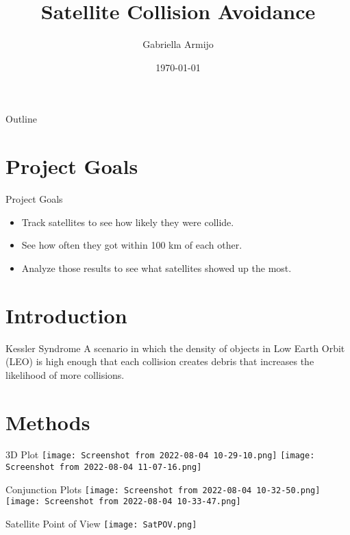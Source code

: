 \documentclass{beamer}
\title{Satellite Collision Avoidance}
\author{Gabriella Armijo}
\institute{Institute for Computing in Research}
\date{\today}
\begin{document}
\begin{frame}
    \titlepage 
\end{frame}

\logo{}


\begin{frame}{Outline}
    \tableofcontents
\end{frame}

\section{Project Goals}
\begin{frame}{Project Goals}
\begin{itemize}
\item Track satellites to see how likely they were collide. 
\item See how often they got within 100 km of each other. 
\item Analyze those results to see what satellites showed up the most.
\end{itemize}
\end{frame}

\section{Introduction}
\begin{frame}{Kessler Syndrome}
A scenario in which the density of objects in Low Earth Orbit (LEO) is high enough that each collision creates debris that increases the likelihood of more collisions.
\end{frame}

\section{Methods}
\begin{frame}{3D Plot}
\texttt{[image: Screenshot from 2022-08-04 10-29-10.png]}
\texttt{[image: Screenshot from 2022-08-04 11-07-16.png]}
\end{frame}

\begin{frame}{Conjunction Plots}
\texttt{[image: Screenshot from 2022-08-04 10-32-50.png]}
\texttt{[image: Screenshot from 2022-08-04 10-33-47.png]}
\end{frame}

\begin{frame}{Satellite Point of View}
\centering
\texttt{[image: SatPOV.png]}
\end{frame}
\end{document}
